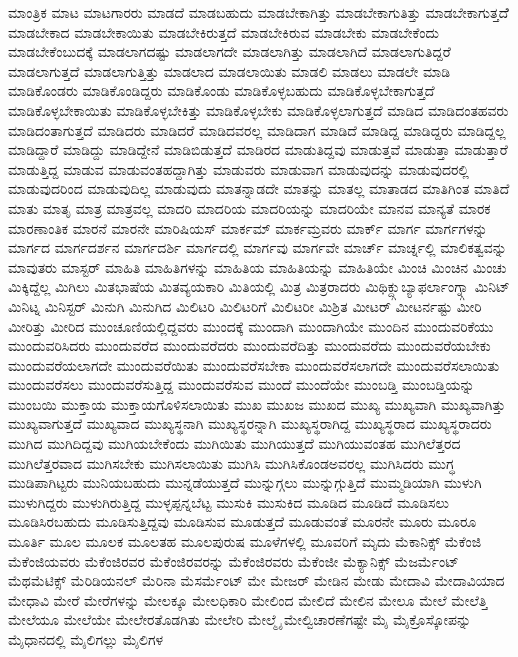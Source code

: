 {ಮಾಂತ್ರಿಕ
ಮಾಟ
ಮಾಟಗಾರರು
ಮಾಡದೆ
ಮಾಡಬಹುದು
ಮಾಡಬೇಕಾಗಿತ್ತು
ಮಾಡಬೇಕಾಗುತಿತ್ತು
ಮಾಡಬೇಕಾಗುತ್ತದೆೆ
ಮಾಡಬೇಕಾದ
ಮಾಡಬೇಕಾಯಿತು
ಮಾಡಬೇಕಿರುತ್ತದೆ
ಮಾಡಬೇಕಿರುವ
ಮಾಡಬೇಕು
ಮಾಡಬೇಕೆಂದು
ಮಾಡಬೇಕೆಂಬುದಕ್ಕೆ
ಮಾಡಲಾಗದಷ್ಟು
ಮಾಡಲಾಗದೇ
ಮಾಡಲಾಗಿತ್ತು
ಮಾಡಲಾಗಿದೆ
ಮಾಡಲಾಗುತಿದ್ದರೆ
ಮಾಡಲಾಗುತ್ತದೆ
ಮಾಡಲಾಗುತ್ತಿತ್ತು
ಮಾಡಲಾದ
ಮಾಡಲಾಯಿತು
ಮಾಡಲಿ
ಮಾಡಲು
ಮಾಡಲೇ
ಮಾಡಿ
ಮಾಡಿಕೊಂಡರು
ಮಾಡಿಕೊಂಡಿದ್ದರು
ಮಾಡಿಕೊಂಡು
ಮಾಡಿಕೊಳ್ಳಬಹುದು
ಮಾಡಿಕೊಳ್ಳಬೇಕಾಗುತ್ತದೆ
ಮಾಡಿಕೊಳ್ಳಬೇಕಾಯಿತು
ಮಾಡಿಕೊಳ್ಳಬೇಕಿತ್ತು
ಮಾಡಿಕೊಳ್ಳಬೇಕು
ಮಾಡಿಕೊಳ್ಳಲಾಗುತ್ತದೆ
ಮಾಡಿದ
ಮಾಡಿದಂತಹವರು
ಮಾಡಿದಂತಾಗುತ್ತದೆ
ಮಾಡಿದರು
ಮಾಡಿದರೆ
ಮಾಡಿದವರಲ್ಲ
ಮಾಡಿದಾಗ
ಮಾಡಿದೆ
ಮಾಡಿದ್ದ
ಮಾಡಿದ್ದರು
ಮಾಡಿದ್ದಲ್ಲ
ಮಾಡಿದ್ದಾರೆ
ಮಾಡಿದ್ದು
ಮಾಡಿದ್ದೇನೆ
ಮಾಡಿಬಿಡುತ್ತದೆ
ಮಾಡಿರದ
ಮಾಡುತಿದ್ದವು
ಮಾಡುತ್ತವೆ
ಮಾಡುತ್ತಾ
ಮಾಡುತ್ತಾರೆ
ಮಾಡುತ್ತಿದ್ದ
ಮಾಡುವ
ಮಾಡುವಂತಹದ್ದಾಗಿತ್ತು
ಮಾಡುವರು
ಮಾಡುವಾಗ
ಮಾಡುವುದನ್ನು
ಮಾಡುವುದರಲ್ಲಿ
ಮಾಡುವುದರಿಂದ
ಮಾಡುವುದಿಲ್ಲ
ಮಾಡುವುದು
ಮಾತನ್ನಾಡದೇ
ಮಾತನ್ನು
ಮಾತಲ್ಲ
ಮಾತಾಡದ
ಮಾತಿಗಿಂತ
ಮಾತಿದೆ
ಮಾತು
ಮಾತೃ
ಮಾತ್ರ
ಮಾತ್ರವಲ್ಲ
ಮಾದರಿ
ಮಾದರಿಯ
ಮಾದರಿಯನ್ನು
ಮಾದರಿಯೇ
ಮಾನವ
ಮಾನ್ಯತೆ
ಮಾರಕ
ಮಾರಣಾಂತಿಕ
ಮಾರನೆ
ಮಾರನೇ
ಮಾರಿಷಿಯಸ್
ಮಾರ್ಕಮ್
ಮಾರ್ಕಮ್ರವರು
ಮಾರ್ಕ್
ಮಾರ್ಗ
ಮಾರ್ಗಗಳನ್ನು
ಮಾರ್ಗದ
ಮಾರ್ಗದರ್ಶನ
ಮಾರ್ಗದರ್ಶಿ
ಮಾರ್ಗದಲ್ಲಿ
ಮಾರ್ಗವು
ಮಾರ್ಗವೇ
ಮಾರ್ಚ್
ಮಾರ್ಚ್ನಲ್ಲಿ
ಮಾಲಿಕತ್ವವನ್ನು
ಮಾವುತರು
ಮಾಸ್ಟರ್
ಮಾಹಿತಿ
ಮಾಹಿತಿಗಳನ್ನು
ಮಾಹಿತಿಯ
ಮಾಹಿತಿಯನ್ನು
ಮಾಹಿತಿಯೇ
ಮಿಂಚಿ
ಮಿಂಚಿನ
ಮಿಂಚು
ಮಿಕ್ಕಿದ್ದೆಲ್ಲ
ಮಿಗಿಲು
ಮಿತಭಾಷೆಯ
ಮಿತವ್ಯಯಕಾರಿ
ಮಿತಿಯಲ್ಲಿ
ಮಿತ್ರ
ಮಿತ್ರರಾದರು
ಮಿಥಿಕ್ದ್ಗುಬ್ಯಾಫರ್ಲಾಂಗ್ನ್ಗಾ
ಮಿನಿಟ್
ಮಿನಿಟ್ನ
ಮಿನಿಸ್ಟರ್
ಮಿನುಗಿ
ಮಿನುಗಿದ
ಮಿಲಿಟರಿ
ಮಿಲಿಟರಿಗೆ
ಮಿಲಿಟರೀ
ಮಿಶ್ರಿತ
ಮೀಟರ್
ಮೀಟರ್ನಷ್ಟು
ಮೀರಿ
ಮೀರಿತ್ತು
ಮೀರಿದ
ಮುಂಚೂಣಿಯಲ್ಲಿದ್ದವರು
ಮುಂದಕ್ಕೆ
ಮುಂದಾಗಿ
ಮುಂದಾಗಿಯೇ
ಮುಂದಿನ
ಮುಂದುವರಿಕೆಯು
ಮುಂದುವರಿಸಿದರು
ಮುಂದುವರೆದ
ಮುಂದುವರೆದರು
ಮುಂದುವರೆದಿತ್ತು
ಮುಂದುವರೆದು
ಮುಂದುವರೆಯಬೇಕು
ಮುಂದುವರೆಯಲಾಗದೇ
ಮುಂದುವರೆಯಿತು
ಮುಂದುವರೆಸಬೇಕಾ
ಮುಂದುವರೆಸಲಾಗದೇ
ಮುಂದುವರೆಸಲಾಯಿತು
ಮುಂದುವರೆಸಲು
ಮುಂದುವರೆಸುತ್ತಿದ್ದ
ಮುಂದುವರೆಸುವ
ಮುಂದೆ
ಮುಂದೆಯೇ
ಮುಂಬಡ್ತಿ
ಮುಂಬಡ್ತಿಯನ್ನು
ಮುಂಬಯಿ
ಮುಕ್ತಾಯ
ಮುಕ್ತಾಯಗೊಳಿಸಲಾಯಿತು
ಮುಖ
ಮುಖಜ
ಮುಖದ
ಮುಖ್ಯ
ಮುಖ್ಯವಾಗಿ
ಮುಖ್ಯವಾಗಿತ್ತು
ಮುಖ್ಯವಾಗುತ್ತದೆ
ಮುಖ್ಯವಾದ
ಮುಖ್ಯಸ್ಥನಾಗಿ
ಮುಖ್ಯಸ್ಥರನ್ನಾಗಿ
ಮುಖ್ಯಸ್ಥರಾಗಿದ್ದ
ಮುಖ್ಯಸ್ಥರಾದ
ಮುಖ್ಯಸ್ಥರಾದರು
ಮುಗಿದ
ಮುಗಿದಿದ್ದವು
ಮುಗಿಯಬೇಕೆಂದು
ಮುಗಿಯಿತು
ಮುಗಿಯುತ್ತದೆ
ಮುಗಿಯುವಂತಹ
ಮುಗಿಲೆತ್ತರದ
ಮುಗಿಲೆತ್ತರವಾದ
ಮುಗಿಸಬೇಕು
ಮುಗಿಸಲಾಯಿತು
ಮುಗಿಸಿ
ಮುಗಿಸಿಕೊಂಡಅವರಲ್ಲ
ಮುಗಿಸಿದರು
ಮುಗ್ಧ
ಮುಡಿಪಾಗಿಟ್ಟರು
ಮುನಿಯಬಹುದು
ಮುನ್ನಡೆಯುತ್ತದೆ
ಮುನ್ನುಗ್ಗಲು
ಮುನ್ನುಗ್ಗುತ್ತಿದೆ
ಮುಮ್ಮಡಿಯಾಗಿ
ಮುಳುಗಿ
ಮುಳುಗಿದ್ದರು
ಮುಳುಗಿರುತ್ತಿದ್ದ
ಮುಳ್ಳಪ್ಪನ್ನಬೆಟ್ಟ
ಮುಸುಕಿ
ಮುಸುಕಿದ
ಮೂಡಿದ
ಮೂಡಿದೆ
ಮೂಡಿಸಲು
ಮೂಡಿಸಿರಬಹುದು
ಮೂಡಿಸುತ್ತಿದ್ದವು
ಮೂಡಿಸುವ
ಮೂಡುತ್ತದೆ
ಮೂಡುವಂತೆ
ಮೂರನೇ
ಮೂರು
ಮೂರೂ
ಮೂರ್ತಿ
ಮೂಲ
ಮೂಲಕ
ಮೂಲತಹ
ಮೂಲಪುರುಷ
ಮೂಳೆಗಳಲ್ಲಿ
ಮೂವರಿಗೆ
ಮೃದು
ಮೆಕಾನಿಕ್ಸ್
ಮೆಕೆಂಜಿ
ಮೆಕೆಂಜಿಯವರು
ಮೆಕೆಂಜಿರವರ
ಮೆಕೆಂಜಿರವರನ್ನು
ಮೆಕೆಂಜಿರವರು
ಮೆಕೆಂಜೀ
ಮೆಕ್ಯಾನಿಕ್ಸ್
ಮೆಜರ್ಮೆಂಟ್
ಮೆಥಮೆಟಿಕ್ಸ್
ಮೆರಿಡಿಯನಲ್
ಮೆರಿನಾ
ಮೆಸರ್ಮೆಂಟ್
ಮೇ
ಮೇಜರ್
ಮೇಡಿನ
ಮೇಡು
ಮೇದಾವಿ
ಮೇದಾವಿಯಾದ
ಮೇಧಾವಿ
ಮೇರೆ
ಮೇರೆಗಳನ್ನು
ಮೇಲಕ್ಕೂ
ಮೇಲಧಿಕಾರಿ
ಮೇಲಿಂದ
ಮೇಲಿದೆ
ಮೇಲಿನ
ಮೇಲೂ
ಮೇಲೆ
ಮೇಲೆತ್ತಿ
ಮೇಲೆಯೂ
ಮೇಲೆಯೇ
ಮೇಲೇರತೊಡಗಿತು
ಮೇಲೇರಿ
ಮೇಲ್ಮೈ
ಮೇಲ್ವಿಚಾರಣೆಗಷ್ಟೇ
ಮೈ
ಮೈಕ್ರೊಸ್ಕೋಪನ್ನು
ಮೈಧಾನದಲ್ಲಿ
ಮೈಲಿಗಲ್ಲು
ಮೈಲಿಗಳ
}
